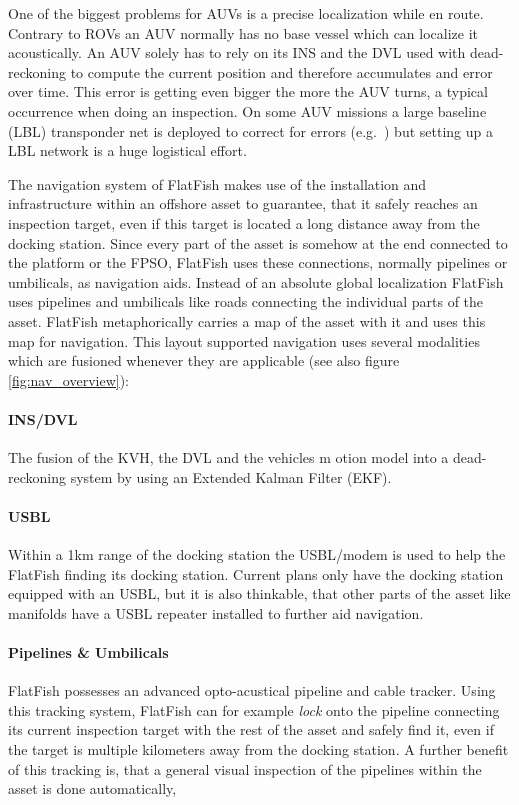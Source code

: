 \documentclass[conference]{IEEEtran}
\begin{document}
One of the biggest problems for AUVs is a precise localization while en route. Contrary to 
ROVs an AUV normally has no base vessel which can localize it acoustically. An AUV solely 
has to rely on its INS and the DVL used with dead-reckoning to compute the current 
position and therefore accumulates and error over time. This error is getting even bigger the 
more the AUV turns, a typical occurrence when doing an inspection. On some AUV missions 
a large baseline (LBL) transponder net is deployed to correct for errors 
(e.g.~\cite{purcell2011}) but setting up a LBL network is a huge logistical effort.

The navigation system of FlatFish makes use of the installation and infrastructure within an 
offshore asset to guarantee, that it safely reaches an inspection target, even if this target is 
located a long distance away from the docking station. Since every part of the asset is 
somehow at the end connected to the platform or the FPSO, FlatFish uses these 
connections, normally pipelines or umbilicals, as navigation aids. Instead of an absolute 
global localization FlatFish uses pipelines and umbilicals like roads connecting the individual 
parts of the asset. FlatFish metaphorically carries a map of the asset with it and uses this 
map for navigation. This layout supported navigation uses several modalities which are 
fusioned whenever they are applicable (see also figure \ref{fig:nav_overview}):
\paragraph*{\textbf{INS/DVL}} The fusion of the KVH, the DVL and the vehicles m
otion model into  a dead-reckoning system by using an Extended Kalman Filter (EKF).
\paragraph*{\textbf{USBL}} Within a 1km range of the docking station the USBL/modem is 
used to help the FlatFish finding its docking station. Current plans only have the docking 
station equipped with an USBL, but it is also thinkable, that other parts of the asset like 
manifolds have a USBL repeater installed to further aid navigation.
\paragraph*{\textbf{Pipelines \& Umbilicals}} FlatFish possesses an advanced 
opto-acustical pipeline and cable tracker. Using this tracking system, FlatFish can for 
example \textit{lock} onto the pipeline connecting its current inspection target with the rest 
of the asset and safely find it, even if the target is multiple kilometers away from the docking 
station. A further benefit of this tracking is, that a general visual inspection of the pipelines 
within the asset is done automatically,
\end{document}
